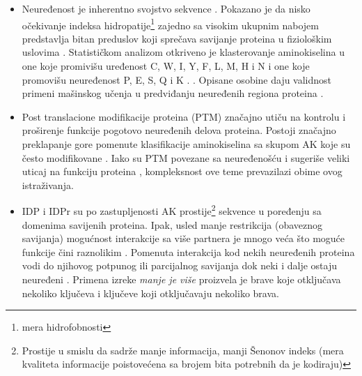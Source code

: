 \begin{itemize}

  \item
    Neuređenost je inherentno svojstvo sekvence \parencite{dunker2001}.
    Pokazano je da nisko očekivanje indeksa hidropatije\footnote{mera hidrofobnosti} zajedno sa visokim
    ukupnim nabojem predstavlja bitan preduslov koji sprečava savijanje
    proteina u fiziološkim uslovima \parencite{uversky2016}. Statističkom
    analizom otkriveno je klasterovanje aminokiselina u one koje promivišu
    uređenost C, W, I, Y, F, L, M, H i N  i one koje
    promovišu neuređenost P, E, S, Q i K .
    \parencite{oldfield2014, uversky2016}. Opisane osobine daju validnost
    primeni mašinskog učenja u predviđanju neuređenih regiona proteina
    \parencite{oldfield2014}.

  \item
    Post translacione modifikacije proteina (PTM) značajno utiču na  kontrolu i
    proširenje funkcije pogotovo neuređenih delova proteina. Postoji značajno
    preklapanje gore pomenute klasifikacije aminokiselina sa skupom AK koje su
    često modifikovane \parencite{uversky2016}. Iako su PTM povezane sa
    neuređenošću i sugeriše veliki uticaj na funkciju proteina
    \parencite{uversky2016}, kompleksnost ove teme prevazilazi obime ovog
    istraživanja.


  \item
    IDP i IDPr su po zastupljenosti AK prostije\footnote{ Prostije u smislu da
      sadrže manje informacija, manji  Šenonov indeks (mera kvaliteta
    informacije poistovećena sa brojem bita potrebnih da je kodiraju) }
    sekvence u poređenju sa domenima savijenih proteina. Ipak, usled manje
    restrikcija (obaveznog savijanja) mogućnost interakcije sa više partnera je
    mnogo veća što moguće funkcije čini raznolikim \parencite{uversky2016}.
    Pomenuta interakcija kod nekih neuređenih proteina vodi do njihovog
    potpunog ili parcijalnog savijanja dok neki i dalje ostaju neuređeni
    \parencite{uversky2016}.  Primena izreke \textit{manje je više} proizvela
    je brave koje otključava nekoliko ključeva i ključeve koji otključavaju
    nekoliko brava.


\end{itemize}
